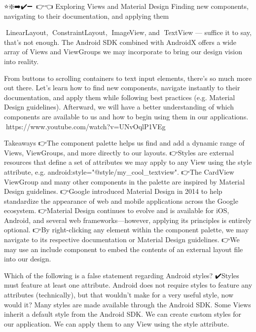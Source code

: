 ⭐❇️➡️✔️➖🔗💎👉👈
Exploring Views and Material Design
        Finding new components, navigating to their documentation, and applying them

        💎LinearLayout, 💎ConstraintLayout, 💎ImageView, and 💎TextView — suffice it to say, that’s not enough. The Android SDK combined with AndroidX offers a wide array of Views and ViewGroups we may incorporate to bring our design vision into reality.

        From buttons to scrolling containers to text input elements, there’s so much more out there. Let’s learn how to find new components, navigate instantly to their documentation, and apply them while following best practices (e.g. Material Design guidelines). Afterward, we will have a better understanding of which components are available to us and how to begin using them in our applications.
            🔗https://www.youtube.com/watch?v=UNvOqlP1VEg

        Takeaways
            👉The component palette helps us find and add a dynamic range of Views, ViewGroups, and more directly to our layouts.
            👉Styles are external resources that define a set of attributes we may apply to any View using the style attribute, e.g. android:style="@style/my_cool_textview".
            👉The CardView ViewGroup and many other components in the palette are inspired by Material Design guidelines.
            👉Google introduced Material Design in 2014 to help standardize the appearance of web and mobile applications across the Google ecosystem.
            👉Material Design continues to evolve and is available for iOS, Android, and several web frameworks—however, applying its principles is entirely optional.
            👉By right-clicking any element within the component palette, we may navigate to its respective documentation or Material Design guidelines.
            👉We may use an include component to embed the contents of an external layout file into our design.

        Which of the following is a false statement regarding Android styles?
            ✔️Styles must feature at least one attribute.
                Android does not require styles to feature any attributes (technically), but that wouldn’t make for a very useful style, now would it?
            Many styles are made available through the Android SDK.
            Some Views inherit a default style from the Android SDK.
            We can create custom styles for our application.
            We can apply them to any View using the style attribute.

